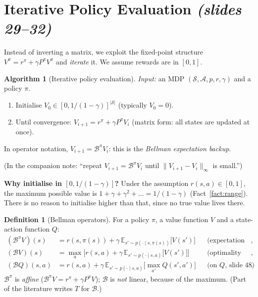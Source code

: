 \documentclass[11pt,a4paper]{article}
\newcommand{\E}{\mathbb{E}}
\newcommand{\cS}{\mathcal{S}}
\newcommand{\cA}{\mathcal{A}}
\newcommand{\Bell}{\mathcal{B}}
\newcommand{\Bpi}{\mathcal{B}^{\pi}}
\newcommand{\norm}[1]{\lVert #1\rVert_\infty}
\newcommand{\slides}[1]{\texorpdfstring{\emph{(slides #1)}}{(slides #1)}}
\newcommand{\pdfnum}[1]{\setcounter{theorem}{\numexpr #1-1\relax}}
\theoremstyle{plain}
\theoremstyle{definition}
\newtheorem{definition}[theorem]{Definition}
\newtheorem{algorithm}{Algorithm}\renewcommand{\thealgorithm}{\Alph{algorithm}}
\theoremstyle{remark}
\begin{document}
\section{Iterative Policy Evaluation \slides{29--32}}\label{sec:itpe}
Instead of inverting a matrix, we exploit the fixed-point structure $V^\pi=r^\pi+\gamma P^\pi V^\pi$ and \emph{iterate} it. We assume rewards are in $[0,1]$.

\begin{algorithm}[Iterative policy evaluation]\label{alg:pe}
\emph{Input:} an MDP $(\cS,\cA,p,r,\gamma)$ and a policy $\pi$.\par
\begin{enumerate}[label=\arabic*.,leftmargin=*]
  \item Initialise $V_0\in[0,1/(1-\gamma)]^{|\cS|}$ (typically $V_0=0$).
  \item Until convergence: $V_{i+1}=r^\pi+\gamma P^\pi V_i$ \quad (matrix form: all states are updated at once).
\end{enumerate}
In operator notation, $V_{i+1}=\Bpi V_i$: this is the \emph{Bellman expectation backup}.
\end{algorithm}
(In the companion note: ``repeat $V_{i+1}=\Bpi V_i$ until $\norm{V_{i+1}-V_i}$ is small.'')

\textbf{Why initialise in $[0,1/(1-\gamma)]$?} Under the assumption $r(s,a)\in[0,1]$, the maximum possible value is $1+\gamma+\gamma^2+\dots=1/(1-\gamma)$ (Fact~\ref{fact:range}). There is no reason to initialise higher than that, since no true value lives there.

\pdfnum{3}
\begin{definition}[Bellman operators]\label{def:bellman}
For a policy $\pi$, a value function $V$ and a state-action function $Q$:
\begin{align*}
(\Bpi V)(s)&=r(s,\pi(s))+\gamma\,\E_{s'\sim p(\cdot\mid s,\pi(s))}\big[V(s')\big] &&\text{(expectation backup, slide 32)},\\
(\Bell V)(s)&=\max_a\Big[r(s,a)+\gamma\,\E_{s'\sim p(\cdot\mid s,a)}\big[V(s')\big]\Big] &&\text{(optimality backup, slide 44)},\\
(\Bell Q)(s,a)&=r(s,a)+\gamma\,\E_{s'\sim p(\cdot\mid s,a)}\Big[\max_{a'}Q(s',a')\Big] &&\text{(on $Q$, slide 48)}.
\end{align*}
$\Bpi$ is \emph{affine} ($\Bpi V=r^\pi+\gamma P^\pi V$); $\Bell$ is \emph{not} linear, because of the maximum. (Part of the literature writes $T$ for $\Bell$.)
\end{definition}
\end{document}

